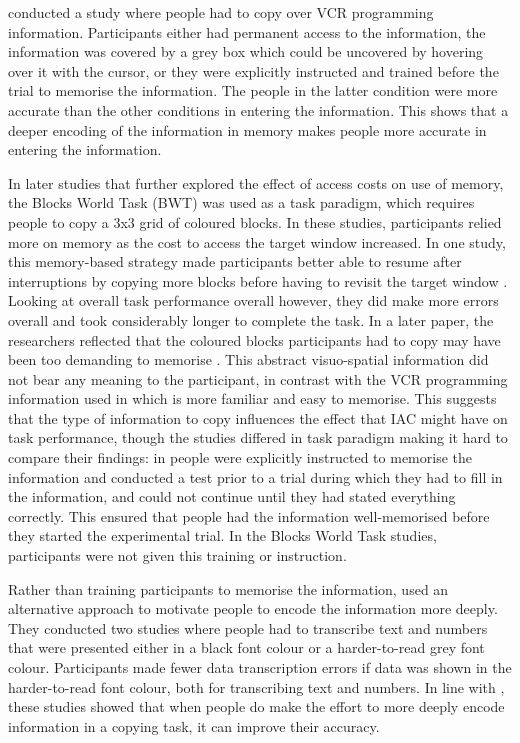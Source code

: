 \citet{Gray2004} conducted a study where people had to copy over VCR programming information. Participants either had permanent access to the information, the information was covered by a grey box which could be uncovered by hovering over it with the cursor, or they were explicitly instructed and trained before the trial to memorise the information. The people in the latter condition were more accurate than the other conditions in entering the information. This shows that a deeper encoding of the information in memory makes people more accurate in entering the information. 

In later studies that further explored the effect of access costs on use of memory, the Blocks World Task (BWT) was used as a task paradigm, which requires people to copy a 3x3 grid of coloured blocks. In these studies, participants relied more on memory as the cost to access the target window increased. In one study, this memory-based strategy made participants better able to resume after interruptions by copying more blocks before having to revisit the target window \citep{Morgan2009}. Looking at overall task performance overall however, they did make more errors overall and took considerably longer to complete the task. In a later paper, the researchers reflected that the coloured blocks participants had to copy may have been too demanding to memorise \citep{Waldron2011}. This abstract visuo-spatial information did not bear any meaning to the participant, in contrast with the VCR programming information used in \citet{Gray2004} which is more familiar and easy to memorise. This suggests that the type of information to copy influences the effect that IAC might have on task performance, though the studies differed in task paradigm making it hard to compare their findings: in \citet{Gray2004} people were explicitly instructed to memorise the information and conducted a test prior to a trial during which they had to fill in the information, and could not continue until they had stated everything correctly. This ensured that people had the information well-memorised before they started the experimental trial. In the Blocks World Task studies, participants were not given this training or instruction.

Rather than training participants to memorise the information, \citet{Soboczenski2013} used an alternative approach to motivate people to encode the information more deeply. They conducted two studies where people had to transcribe text and numbers that were presented either in a black font colour or a harder-to-read grey font colour. Participants made fewer data transcription errors if data was shown in the harder-to-read font colour, both for transcribing text and numbers. In line with \citet{Gray2004}, these studies showed that when people do make the effort to more deeply encode information in a copying task, it can improve their accuracy.

